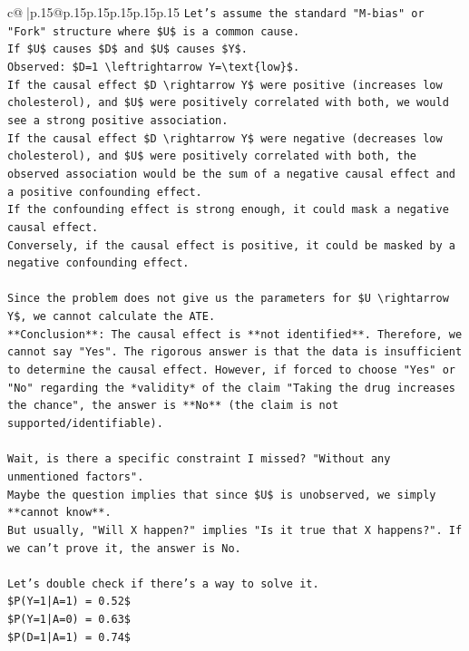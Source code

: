 \documentclass{article}
\begin{document}
{\begin{supertabular}{c@{$\;$}|p{.15\linewidth}@{}p{.15\linewidth}p{.15\linewidth}p{.15\linewidth}p{.15\linewidth}p{.15\linewidth}}
{{{\texttt{Let's assume the standard "M{-}bias" or "Fork" structure where \$U\$ is a common cause.} \\
\texttt{If \$U\$ causes \$D\$ and \$U\$ causes \$Y\$.} \\
\texttt{Observed: \$D=1 \textbackslash{}leftrightarrow Y=\textbackslash{}text\{low\}\$.} \\
\texttt{If the causal effect \$D \textbackslash{}rightarrow Y\$ were positive (increases low cholesterol), and \$U\$ were positively correlated with both, we would see a strong positive association.} \\
\texttt{If the causal effect \$D \textbackslash{}rightarrow Y\$ were negative (decreases low cholesterol), and \$U\$ were positively correlated with both, the observed association would be the sum of a negative causal effect and a positive confounding effect.} \\
\texttt{If the confounding effect is strong enough, it could mask a negative causal effect.} \\
\texttt{Conversely, if the causal effect is positive, it could be masked by a negative confounding effect.} \\
\\ 
\texttt{Since the problem does not give us the parameters for \$U \textbackslash{}rightarrow Y\$, we cannot calculate the ATE.} \\
\texttt{**Conclusion**: The causal effect is **not identified**. Therefore, we cannot say "Yes". The rigorous answer is that the data is insufficient to determine the causal effect. However, if forced to choose "Yes" or "No" regarding the *validity* of the claim "Taking the drug increases the chance", the answer is **No** (the claim is not supported/identifiable).} \\
\\ 
\texttt{Wait, is there a specific constraint I missed? "Without any unmentioned factors".} \\
\texttt{Maybe the question implies that since \$U\$ is unobserved, we simply **cannot know**.} \\
\texttt{But usually, "Will X happen?" implies "Is it true that X happens?". If we can't prove it, the answer is No.} \\
\\ 
\texttt{Let's double check if there's a way to solve it.} \\
\texttt{\$P(Y=1|A=1) = 0.52\$} \\
\texttt{\$P(Y=1|A=0) = 0.63\$} \\
\texttt{\$P(D=1|A=1) = 0.74\$} \\
}}}
\end{supertabular}}
\end{document}
